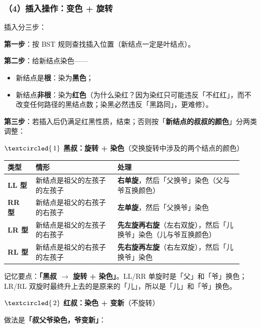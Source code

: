 \documentclass[11pt,openany,UTF8]{ctexbook}
\newcommand{\circled}[1]{\textcircled{\scriptsize\,#1}}
\begin{document}
\subsubsection{（4）插入操作：变色 + 旋转}

插入分三步：

\textbf{第一步}：按 BST 规则查找插入位置（新结点一定是叶结点）。

\textbf{第二步}：给新结点染色——

\begin{itemize}
\item 新结点是\textbf{根}：染为\textbf{黑色}；
\item 新结点\textbf{非根}：染为\textbf{红色}（为什么染红？因为染红只可能违反「不红红」，而不改变任何路径的黑结点数；染黑必然违反「黑路同」，更难修）。
\end{itemize}
\textbf{第三步}：若插入后仍满足红黑性质，结束；否则按「\textbf{新结点的叔叔的颜色}」分两类调整：

\textbf{$\circled{1}$ 黑叔：旋转 + 染色}（交换旋转中涉及的两个结点的颜色）

\begingroup\small\setlength{\tabcolsep}{4.0pt}
\begin{longtable}{@{}L{0.1105\linewidth}L{0.3206\linewidth}L{0.4974\linewidth}@{}}
\toprule
\textbf{类型} & \textbf{情形} & \textbf{处理} \\
\midrule
\endhead
\textbf{LL 型} & 新结点是祖父的左孩子的左孩子 & \textbf{右单旋}，然后「父换爷」染色（父与爷互换颜色） \\
\textbf{RR 型} & 新结点是祖父的右孩子的右孩子 & \textbf{左单旋}，然后「父换爷」染色 \\
\textbf{LR 型} & 新结点是祖父的左孩子的右孩子 & \textbf{先左旋再右旋}（左右双旋），然后「儿换爷」染色（儿与爷互换颜色） \\
\textbf{RL 型} & 新结点是祖父的右孩子的左孩子 & \textbf{先右旋再左旋}（右左双旋），然后「儿换爷」染色 \\
\bottomrule
\end{longtable}
\endgroup

记忆要点：\textbf{「黑叔 $\to$ 旋转 + 染色」}。LL/RR 单旋时是「父」和「爷」换色；LR/RL 双旋时最终升上去的是原来的「儿」，所以是「儿」和「爷」换色。

\textbf{$\circled{2}$ 红叔：染色 + 变新}（不旋转）

做法是\textbf{「叔父爷染色，爷变新」}：
\end{document}
